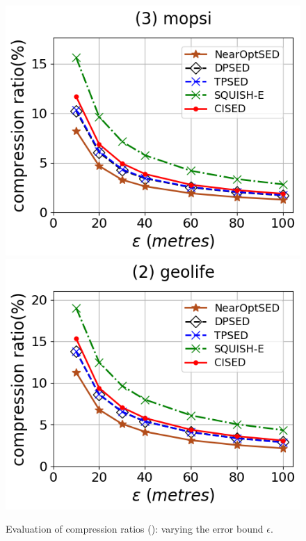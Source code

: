 \begin{figure}[tb!]
	\includegraphics[scale=0.315]{Figures/Exp-SED-CR-epsilon-mopsi.png}		\hspace{1ex}
	\includegraphics[scale=0.315]{Figures/Exp-SED-CR-epsilon-geolife.png}
	\vspace{-2.5ex}
	\caption{\small Evaluation of compression ratios (\sed): varying the error bound $\epsilon$.}
	\label{fig:cr-sed}
	\vspace{-.5ex}
\end{figure}

